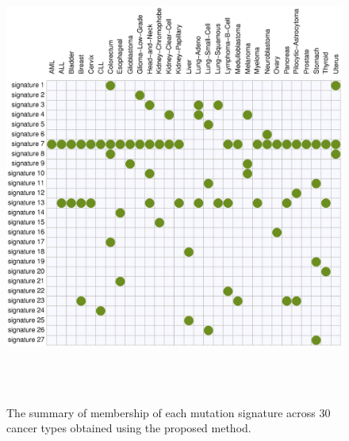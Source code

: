 \begin{figure}[b]
\centering
\includegraphics[width=15cm,height=15cm]{corrplot.eps}
\caption{The summary of membership of each mutation signature across 30 cancer types obtained using the proposed method.}
\label{nature2013_sig_member}
\end{figure}


\clearpage




